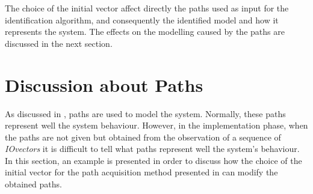 The choice of the initial vector affect directly the paths used as input for the
identification algorithm, and consequently the identified
model and how it represents the system. The effects on the modelling caused by
the paths are discussed in the
next section.

\section{Discussion about Paths}
As discussed in , paths are used to model the
system. Normally, these paths represent well the system behaviour. However, in
the implementation phase, when the paths are not given but obtained from the
observation of a sequence of \emph{IOvectors} it is difficult to tell what paths
represent well the system's behaviour. In this section, an example is presented
in order to discuss how the
choice of the initial vector for the path acquisition method presented in 
can modify the obtained paths.

